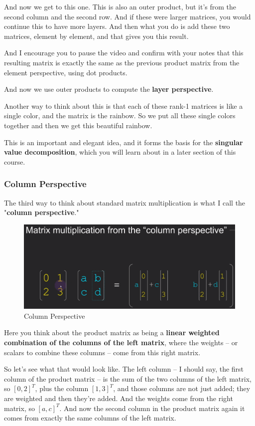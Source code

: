 \documentclass[fleqn,10pt]{olplainarticle}
\theoremstyle{definition}
\theoremstyle{remark}
\begin{document}
And now we get to this one. This is also an outer product, but it's from the second column and the second row. And if these were larger matrices, you would continue this to have more layers. And then what you do is add these two matrices, element by element, and that gives you this result.

And I encourage you to pause the video and confirm with your notes that this resulting matrix is exactly the same as the previous product matrix from the element perspective, using dot products.

And now we use outer products to compute the \textbf{layer perspective}.

Another way to think about this is that each of these rank-1 matrices is like a single color, and the matrix is the rainbow. So we put all these single colors together and then we get this beautiful rainbow.

This is an important and elegant idea, and it forms the basis for the \textbf{singular value decomposition}, which you will learn about in a later section of this course.

\subsubsection*{Column Perspective}

The third way to think about standard matrix multiplication is what I call the "\textbf{column perspective}."

\begin{figure}[ht]
	\centering
	\includegraphics[width=0.7\linewidth]{images/multi-04.png}
	\caption{Column Perspective}
	\label{fig:multi_04}
\end{figure}

Here you think about the product matrix as being a \textbf{linear weighted combination of the columns of the left matrix}, where the weights -- or scalars to combine these columns -- come from this right matrix.

So let's see what that would look like. The left column -- I should say, the first column of the product matrix -- is the sum of the two columns of the left matrix, so $[0, 2]^T$, plus the column $[1, 3]^T$, and those columns are not just added; they are weighted and then they're added. And the weights come from the right matrix, so $[a, c]^T$. And now the second column in the product matrix again it comes from exactly the same columns of the left matrix.
\end{document}
